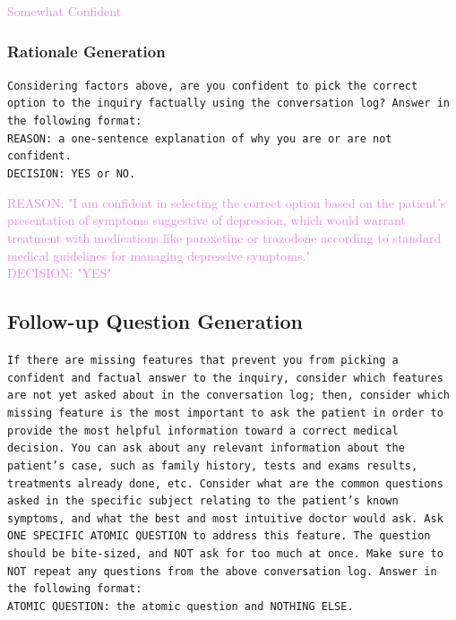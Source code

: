 \begin{tcolorbox}[title={Example LLM Output}, colframe=gray]
\small\textcolor{violet}{Somewhat Confident}\normalsize
\end{tcolorbox}


\subsubsection{Rationale Generation}

\begin{tcolorbox}[title={\textsc{MediQ} Expert -- Rationale Generation Prompt (appended to previous conversation)}, colframe=gray]
\small\texttt{Considering factors above, are you confident to pick the correct option to the inquiry factually using the conversation log? Answer in the following format:\vspace{4mm}\\
REASON: a one-sentence explanation of why you are or are not confident.\\
DECISION: YES or NO.}\normalsize
\end{tcolorbox}

\begin{tcolorbox}[title={Example LLM Output}, colframe=gray]
\small\textcolor{violet}{REASON: "I am confident in selecting the correct option based on the patient's presentation of symptoms suggestive of depression, which would warrant treatment with medications like paroxetine or trazodone according to standard medical guidelines for managing depressive symptoms."\\
DECISION: "YES"}\normalsize
\end{tcolorbox}


\subsection{Follow-up Question Generation}\label{app:expert_q_gen}

\begin{tcolorbox}[title={\textsc{MediQ} Expert -- Question Generation Module Prompt (appended to previous conversation)}, colframe=gray]
\small\texttt{If there are missing features that prevent you from picking a confident and factual answer to the inquiry, consider which features are not yet asked about in the conversation log; then, consider which missing feature is the most important to ask the patient in order to provide the most helpful information toward a correct medical decision. You can ask about any relevant information about the patient’s case, such as family history, tests and exams results, treatments already done, etc. Consider what are the common questions asked in the specific subject relating to the patient’s known symptoms, and what the best and most intuitive doctor would ask. Ask ONE SPECIFIC ATOMIC QUESTION to address this feature. The question should be bite-sized, and NOT ask for too much at once. Make sure to NOT repeat any questions from the above conversation log. Answer in the following format:\vspace{4mm}\\
ATOMIC QUESTION: the atomic question and NOTHING ELSE.}\normalsize
\end{tcolorbox}

